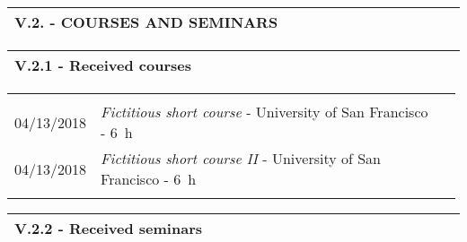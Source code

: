 \documentclass[11pt, letterpaper]{extarticle}
\begin{document}

	\label{sec:V.2.}
	\begin{longtable}{C{1.012\linewidth}N}
		\textbf{\large V.2. - COURSES AND SEMINARS} & \\[0.70cm] \hline
	\end{longtable}


	\label{sec:V.2.1.}
	\begin{longtable}{L{1.012\linewidth}N}
		\textbf{\large V.2.1 - Received courses} & \\[0.60cm] \hline
	\end{longtable}

	\begin{longtable}{C{0.154\linewidth}C{0.834\linewidth}N}
		                                                             &                                                                                                                                                                                                                                                  & \\[-0.12cm]
		04/13/2018                                                   & \textit{Fictitious short course} - University of San Francisco - 6~h                                                                                                                                                                             & \\[0.40cm]
		04/13/2018                                                   & \textit{Fictitious short course II} - University of San Francisco - 6~h                                                                                                                                                                          & \\[0.40cm]
		                                                             &                                                                                                                                                                                                                                                  & \\[-0.12cm] \hline
	\end{longtable}


	\label{sec:V.2.2.}
	\begin{longtable}{L{1.012\linewidth}N}
		\textbf{\large V.2.2 - Received seminars} & \\[0.60cm] \hline
	\end{longtable}
\end{document}
